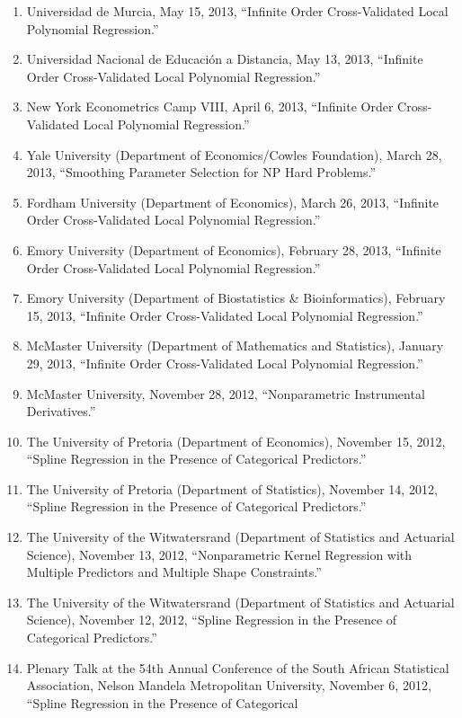 \documentclass[
]{article}
\begin{document}
\begin{enumerate}
\item
  Universidad de Murcia, May 15, 2013, ``Infinite Order Cross-Validated
  Local Polynomial Regression.''
\item
  Universidad Nacional de Educación a Distancia, May 13, 2013,
  ``Infinite Order Cross-Validated Local Polynomial Regression.''
\item
  New York Econometrics Camp VIII, April 6, 2013, ``Infinite Order
  Cross-Validated Local Polynomial Regression.''
\item
  Yale University (Department of Economics/Cowles Foundation), March 28,
  2013, ``Smoothing Parameter Selection for NP Hard Problems.''
\item
  Fordham University (Department of Economics), March 26, 2013,
  ``Infinite Order Cross-Validated Local Polynomial Regression.''
\item
  Emory University (Department of Economics), February 28, 2013,
  ``Infinite Order Cross-Validated Local Polynomial Regression.''
\item
  Emory University (Department of Biostatistics \& Bioinformatics),
  February 15, 2013, ``Infinite Order Cross-Validated Local Polynomial
  Regression.''
\item
  McMaster University (Department of Mathematics and Statistics),
  January 29, 2013, ``Infinite Order Cross-Validated Local Polynomial
  Regression.''
\item
  McMaster University, November 28, 2012, ``Nonparametric Instrumental
  Derivatives.''
\item
  The University of Pretoria (Department of Economics), November 15,
  2012, ``Spline Regression in the Presence of Categorical Predictors.''
\item
  The University of Pretoria (Department of Statistics), November 14,
  2012, ``Spline Regression in the Presence of Categorical Predictors.''
\item
  The University of the Witwatersrand (Department of Statistics and
  Actuarial Science), November 13, 2012, ``Nonparametric Kernel
  Regression with Multiple Predictors and Multiple Shape Constraints.''
\item
  The University of the Witwatersrand (Department of Statistics and
  Actuarial Science), November 12, 2012, ``Spline Regression in the
  Presence of Categorical Predictors.''
\item
  Plenary Talk at the 54th Annual Conference of the South African
  Statistical Association, Nelson Mandela Metropolitan University,
  November 6, 2012, ``Spline Regression in the Presence of Categorical

\end{enumerate}
\end{document}
